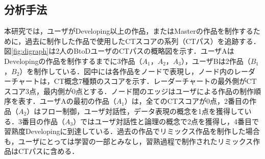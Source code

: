 \documentclass[submit,ses,noauthor]{ipsj}
\newcommand{\todo}[1]{\colorbox{yellow}{{\bf TODO}:}{\color{red} {\textbf{[#1]}}}}
\begin{document}
\subsection{分析手法}\label{sec:rq1-approach}


本研究では，ユーザがDeveloping以上の作品，またはMasterの作品を制作するために，過去に制作した作品で使用したCTスコアの系列（CTパス）を追跡する．
図\ref{fig:digraph}は2人のBtoDユーザのCTパスの概略図を示す．ユーザAはDevelopingの作品を制作するまでに3作品（$A_1$，$A_2$，$A_3$），ユーザBは2作品（$B_1$，$B_2$）を制作している．図中には各作品をノードで表現し，ノード内のレーダーチャートは，CT概念7種類のスコアを示す．レーダーチャートの最外側がCTスコア3点，最内側が0点とする．ノード間のエッジはユーザによる作品の制作順序を表す．ユーザAの最初の作品（$A_1$）は，全てのCTスコアが0点，2番目の作品（$A_2$）はフロー制御，ユーザ対話性，データ表現の概念を1点を獲得している．3番目の作品（$A_3$）ではユーザ対話性と論理の概念で2点を獲得し，4番目で習熟度Developingに到達している．過去の作品でリミックス作品を制作した場合も，ユーザにとっては学習の一部とみなし，習熟過程で制作されたリミックス作品はCTパスに含める．

\end{document}
